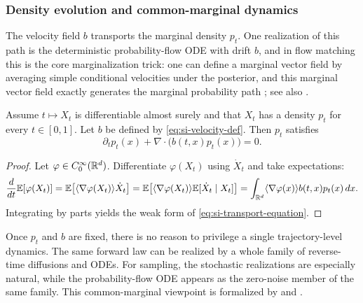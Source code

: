 \subsubsection{Density evolution and common-marginal dynamics}
\label{subsubsec:diffusion-density-evolution}

The velocity field \(b\) transports the marginal density \(p_t\).
One realization of this path is the deterministic probability-flow ODE with drift \(b\), and in flow matching this is the core marginalization trick: one can define a marginal vector field by averaging simple conditional velocities under the posterior, and this marginal vector field exactly generates the marginal probability path \citep[\S3.1]{lipman_chen_ben_hamu_nickel_le_2023_flow_matching}; see also \citet[Thm.~11]{holderrieth_erives_2026_intro_flow_matching}.

\begin{proposition}
\label{prop:si-transport-equation}
Assume \(t\mapsto X_t\) is differentiable almost surely and that \(X_t\) has a density \(p_t\) for every \(t\in[0,1]\).
Let \(b\) be defined by \eqref{eq:si-velocity-def}.
Then \(p_t\) satisfies
\begin{equation}
  \partial_t p_t(x) + \nabla\cdot\bigl(b(t,x)p_t(x)\bigr)=0.
  \label{eq:si-transport-equation}
\end{equation}
\end{proposition}
\begin{proof}
Let \(\varphi\in C_0^\infty(\mathbb{R}^d)\).
Differentiate \(\varphi(X_t)\) using \(\dot X_t\) and take expectations:
\[
  \frac{d}{dt}\mathbb{E}[\varphi(X_t)]
  =
  \mathbb{E}\!\left[\langle\nabla\varphi(X_t)\rangle{\dot X_t}\right]
  =
  \mathbb{E}\!\left[\langle\nabla\varphi(X_t)\rangle{\mathbb{E}[\dot X_t\mid X_t]}\right]
  =
  \int_{\mathbb{R}^d}\langle\nabla\varphi(x)\rangle{b(t,x)}p_t(x)\,dx.
\]
Integrating by parts yields the weak form of \eqref{eq:si-transport-equation}.
\end{proof}

Once \(p_t\) and \(b\) are fixed, there is no reason to privilege a single trajectory-level dynamics.
The same forward law can be realized by a whole family of reverse-time diffusions and ODEs.
For sampling, the stochastic realizations are especially natural, while the probability-flow ODE appears as the zero-noise member of the same family.
This common-marginal viewpoint is formalized by \citet[\S2]{albergo_boffi_vanden_eijnden_2025_stochastic_interpolants} and \citet[Thm.~17]{holderrieth_erives_2026_intro_flow_matching}.

